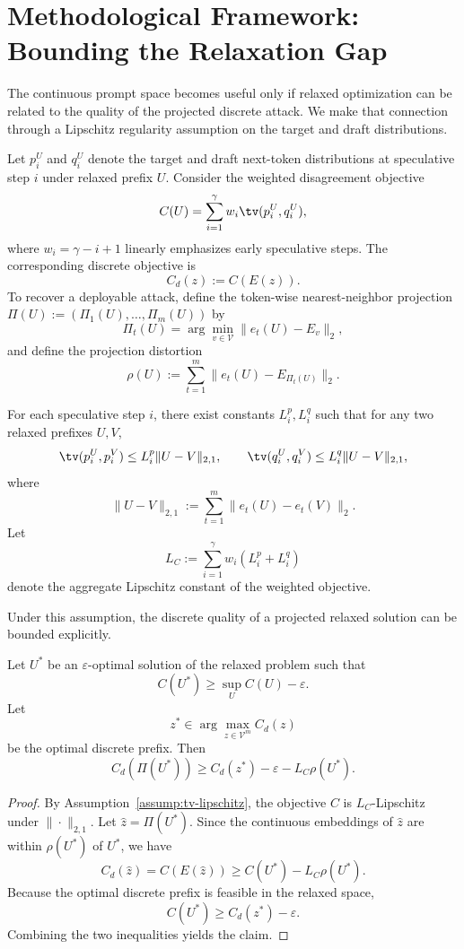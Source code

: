 \section{Methodological Framework: Bounding the Relaxation Gap}
\label{sec:framework}

The continuous prompt space becomes useful only if relaxed optimization can be
related to the quality of the projected discrete attack. We make that
connection through a Lipschitz regularity assumption on the target and draft
distributions.

Let $p_i^U$ and $q_i^U$ denote the target and draft next-token distributions at
speculative step $i$ under relaxed prefix $U$. Consider the weighted
disagreement objective
\[
C(U) = \sum_{i=1}^{\gamma} w_i \tv(p_i^U, q_i^U),
\]
where $w_i = \gamma - i + 1$ linearly emphasizes early speculative steps. The
corresponding discrete objective is
\[
C_d(z) := C(E(z)).
\]
To recover a deployable attack, define the token-wise nearest-neighbor
projection $\Pi(U) := (\Pi_1(U), \dots, \Pi_m(U))$ by
\[
\Pi_t(U) = \arg\min_{v \in \mathcal{V}} \|e_t(U) - E_v\|_2,
\]
and define the projection distortion
\[
\rho(U) := \sum_{t=1}^{m} \|e_t(U) - E_{\Pi_t(U)}\|_2.
\]

\begin{assumption}[TV-Lipschitzness]
\label{assump:tv-lipschitz}
For each speculative step $i$, there exist constants $L_i^p, L_i^q$ such that
for any two relaxed prefixes $U, V$,
\[
\tv(p_i^U, p_i^V) \le L_i^p \|U - V\|_{2,1},
\qquad
\tv(q_i^U, q_i^V) \le L_i^q \|U - V\|_{2,1},
\]
where
\[
\|U - V\|_{2,1} := \sum_{t=1}^{m} \|e_t(U) - e_t(V)\|_2.
\]
Let
\[
L_C := \sum_{i=1}^{\gamma} w_i (L_i^p + L_i^q)
\]
denote the aggregate Lipschitz constant of the weighted objective.
\end{assumption}

Under this assumption, the discrete quality of a projected relaxed solution can
be bounded explicitly.

\begin{theorem}
\label{thm:relax-gap}
Let $U^*$ be an $\varepsilon$-optimal solution of the relaxed problem such that
\[
C(U^*) \ge \sup_U C(U) - \varepsilon.
\]
Let
\[
z^* \in \arg\max_{z \in \mathcal{V}^m} C_d(z)
\]
be the optimal discrete prefix. Then
\[
C_d(\Pi(U^*)) \ge C_d(z^*) - \varepsilon - L_C \rho(U^*).
\]
\end{theorem}

\begin{proof}
By Assumption~\ref{assump:tv-lipschitz}, the objective $C$ is $L_C$-Lipschitz
under $\|\cdot\|_{2,1}$. Let $\hat{z} = \Pi(U^*)$. Since the continuous
embeddings of $\hat{z}$ are within $\rho(U^*)$ of $U^*$, we have
\[
C_d(\hat{z}) = C(E(\hat{z})) \ge C(U^*) - L_C \rho(U^*).
\]
Because the optimal discrete prefix is feasible in the relaxed space,
\[
C(U^*) \ge C_d(z^*) - \varepsilon.
\]
Combining the two inequalities yields the claim.
\end{proof}

